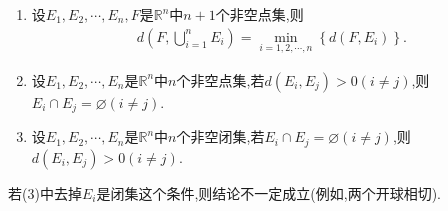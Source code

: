 \documentclass[../../main.tex]{subfiles}
\begin{document}
\begin{proposition}[点集间的距离的性质]\label{proposition:点集间的距离的性质}
\begin{enumerate}[(1)]
\item 设$E_1,E_2,\cdots,E_n,F$是$\mathbb{R}^n$中$n+1$个非空点集,则
\begin{align*}
d\left( F,\bigcup_{i=1}^n{E_i} \right) =\underset{i=1,2,\cdots ,n}{\min}\left\{ d\left( F,E_i \right) \right\}.
\end{align*}

\item 设$E_1,E_2,\cdots,E_n$是$\mathbb{R}^n$中$n$个非空点集,若$d(E_i,E_j)>0(i\ne j)$,则$E_i\cap E_j=\varnothing (i\ne j)$.

\item 设$E_1,E_2,\cdots,E_n$是$\mathbb{R}^n$中$n$个非空闭集,若$E_i\cap E_j=\varnothing (i\ne j)$,则$d(E_i,E_j)>0(i\ne j)$.
\end{enumerate}
\end{proposition}
\begin{remark}
若(3)中去掉$E_i$是闭集这个条件,则结论不一定成立(例如,两个开球相切).
\end{remark}
\end{document}
